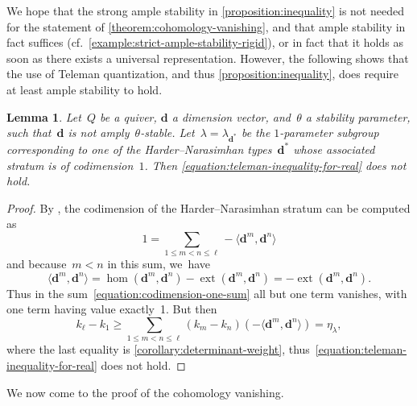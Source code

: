 \documentclass[JEP,XML,SOM,Unicode,NoEqCountersInSection,published]{cedram}
\theoremstyle{plain}
\newtheorem{lemma}[theorem]{Lemma}
\theoremstyle{definition}
\newcommand\tuple[1]{\ensuremath{{\boldsymbol{#1}}}}
\begin{document}
We hope that the strong ample stability in \cref{proposition:inequality}
is not needed for the statement of \cref{theorem:cohomology-vanishing},
and that ample stability in fact suffices
(cf.~\cref{example:strict-ample-stability-rigid}),
or in fact that it holds as soon as there exists a universal representation.
However, the following shows that the use of Teleman quantization,
and thus \cref{proposition:inequality},
does require at least ample stability to hold.

\begin{lemma}
\label{lemma:teleman-implies-ample-stability}
Let~$Q$ be a quiver,
$\tuple{d}$ a dimension vector,
and~$\theta$ a stability parameter,
such that~$\tuple{d}$ is not amply~$\theta$-stable.
Let~$\lambda=\lambda_{\tuple{d}^*}$ be the $1$-parameter subgroup
corresponding to one of the Harder--Narasimhan types~$\tuple{d}^*$
whose associated stratum is of codimension~$1$.
Then \eqref{equation:teleman-inequality-for-real} does not hold.
\end{lemma}

\begin{proof}
By \cite[Prop.\,3.4]{MR1974891},
the codimension of the Harder--Narasimhan stratum can be computed as
\begin{equation}
\label{equation:codimension-one-sum}
1=\sum_{1\leq m<n\leq\ell}-\langle\tuple{d}^m,\tuple{d}^n\rangle
\end{equation}
and because~$m<n$ in this sum, we~have
\begin{equation*}
\langle\tuple{d}^m,\tuple{d}^n\rangle
=\operatorname{hom}(\tuple{d}^m,\tuple{d}^n)-\operatorname{ext}(\tuple{d}^m,\tuple{d}^n)
=-\operatorname{ext}(\tuple{d}^m,\tuple{d}^n).
\end{equation*}
Thus in the sum~\eqref{equation:codimension-one-sum}
all but one term vanishes,
with one term having value exactly~1.
But then
\begin{equation*}
k_\ell-k_1\geq\sum_{1\leq m<n\leq\ell}(k_m-k_n)(-\langle\tuple{d}^m,\tuple{d}^n\rangle)=\eta_\lambda,
\end{equation*}
where the last equality is \cref{corollary:determinant-weight},
thus~\eqref{equation:teleman-inequality-for-real} does not hold.
\end{proof}

We now come to the proof of the cohomology vanishing.
\end{document}
